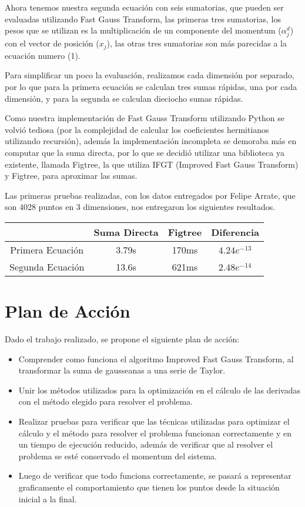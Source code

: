 \documentclass[letter, 10pt]{article}
\begin{document}
Ahora tenemos nuestra segunda ecuación con seis sumatorias, que pueden ser evaluadas utilizando Fast Gauss Transform, las primeras tres sumatorias, los pesos que se utilizan es la multiplicación de un componente del momentum ($\alpha_j^d$) con el vector de posición ($x_j$), las otras tres sumatorias son más parecidas a la ecuación numero (1).

Para simplificar un poco la evaluación, realizamos cada dimensión por separado, por lo que para la primera ecuación se calculan tres sumas rápidas, una por cada dimensión, y para la segunda se calculan dieciocho sumas rápidas.

Como nuestra implementación de Fast Gauss Transform utilizando Python se volvió tediosa (por la complejidad de calcular los coeficientes hermitianos utilizando recursión), además la implementación incompleta se demoraba más en computar que la suma directa, por lo que se decidió utilizar una biblioteca ya existente, llamada Figtree, la que utiliza IFGT (Improved Fast Gauss Transform) y Figtree, para aproximar las sumas.

Las primeras pruebas realizadas, con los datos entregados por Felipe Arrate, que son 4028 puntos en 3 dimensiones, nos entregaron los siguientes resultados.

\begin{center}
    \begin{tabular}{c|c|c|c}
                     & Suma Directa & Figtree & Diferencia  \\ \hline
    Primera Ecuación & 3.79s & 170ms & $4.24e^{-13}$ \\
    Segunda Ecuación & 13.6s & 621ms & $2.48e^{-14}$ 
    \end{tabular}
\end{center}
\section{Plan de Acción}

Dado el trabajo realizado, se propone el siguiente plan de acción:

\begin{itemize}
\item Comprender como funciona el algoritmo Improved Fast Gauss Transform, al transformar la suma de gausseanas a una serie de Taylor.
\item Unir los métodos utilizados para la optimización en el cálculo de las derivadas con el método elegido
para resolver el problema.
\item Realizar pruebas para verificar que las técnicas utilizadas para optimizar el cálculo y el método
para resolver el problema funcionan correctamente y en un tiempo de ejecución reducido, además de verificar
que al resolver el problema se esté conservado el momentum del sistema.
\item Luego de verificar que todo funciona correctamente, se pasará a representar graficamente el comportamiento
que tienen los puntos desde la situación inicial a la final.
\end{itemize}
\end{document}

